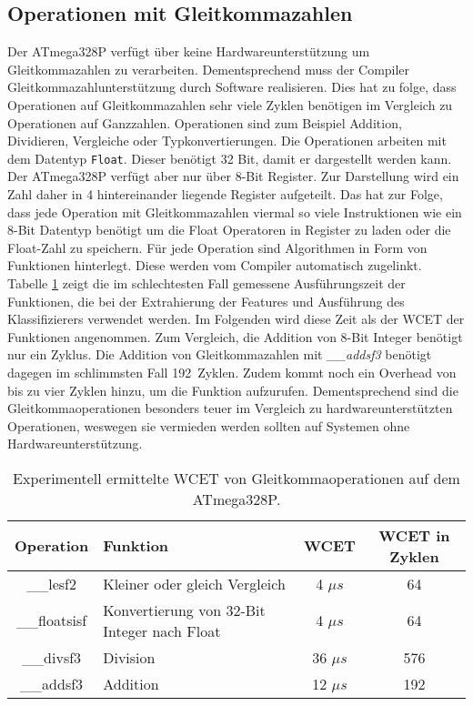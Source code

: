 \subsection{Operationen mit Gleitkommazahlen}
Der ATmega328P verfügt über keine Hardwareunterstützung um Gleitkommazahlen zu verarbeiten. Dementsprechend muss der Compiler Gleitkommazahlunterstützung durch Software realisieren. Dies hat zu folge, dass Operationen
auf Gleitkommazahlen sehr viele Zyklen benötigen im Vergleich zu Operationen auf Ganzzahlen. Operationen sind zum Beispiel Addition, Dividieren, Vergleiche oder Typkonvertierungen.
\newline
\newline
Die Operationen arbeiten mit dem Datentyp \texttt{Float}. Dieser benötigt 32 Bit, damit er dargestellt werden kann. Der ATmega328P verfügt aber nur über 8-Bit Register. Zur Darstellung wird ein Zahl daher in 4 hintereinander
liegende Register aufgeteilt. Das hat zur Folge, dass jede Operation mit Gleitkommazahlen viermal so viele Instruktionen wie ein 8-Bit Datentyp benötigt um die Float Operatoren in Register zu laden oder die
Float-Zahl zu speichern.
\newline
\newline
Für jede Operation sind Algorithmen in Form von Funktionen hinterlegt. Diese werden vom Compiler automatisch zugelinkt. Tabelle \ref{tab:float_operations} zeigt die im schlechtesten Fall gemessene Ausführungszeit
der Funktionen, die bei der Extrahierung der Features und Ausführung des Klassifizierers verwendet werden. Im Folgenden wird diese Zeit als der WCET der Funktionen angenommen.
Zum Vergleich, die Addition von 8-Bit Integer benötigt nur ein Zyklus. Die Addition von Gleitkommazahlen mit \textit{\_\_addsf3} benötigt dagegen im schlimmsten Fall 192~Zyklen. Zudem kommt noch ein
Overhead von bis zu vier Zyklen hinzu, um die Funktion aufzurufen. Dementsprechend sind die Gleitkommaoperationen besonders teuer im Vergleich zu hardwareunterstützten Operationen, weswegen sie vermieden
werden sollten auf Systemen ohne Hardwareunterstützung.
\begin{table}[h!]
    \centering
    \begin{tabular}{ | c | l | c | c |}
        \hline
        Operation & Funktion & WCET & WCET in Zyklen \\\hline
        \_\_lesf2 & Kleiner oder gleich Vergleich & 4 $\mu s$ & 64 \\\hline
        \_\_floatsisf & Konvertierung von 32-Bit Integer nach Float & 4 $\mu s$ & 64 \\\hline
        \_\_divsf3 & Division & 36 $\mu s$ & 576 \\\hline
        \_\_addsf3 & Addition & 12 $\mu s$ & 192 \\\hline
    \end{tabular}
    \caption{Experimentell ermittelte WCET von Gleitkommaoperationen auf dem ATmega328P.}
    \label{tab:float_operations}
\end{table}